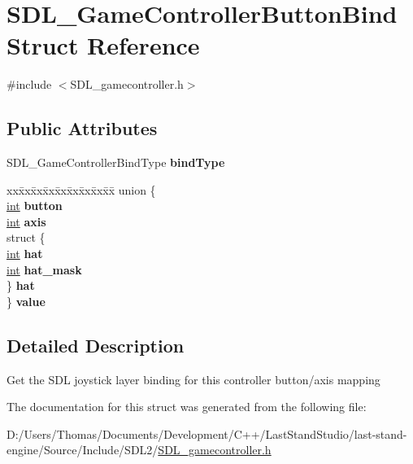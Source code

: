 \hypertarget{structSDL__GameControllerButtonBind}{}\section{S\+D\+L\+\_\+\+Game\+Controller\+Button\+Bind Struct Reference}
\label{structSDL__GameControllerButtonBind}


{\ttfamily \#include $<$S\+D\+L\+\_\+gamecontroller.\+h$>$}

\subsection*{Public Attributes}
\begin{DoxyCompactItemize}
\item 
\hypertarget{structSDL__GameControllerButtonBind_a032fd941b0e8e5e2cdf52b7597f559b9}{}S\+D\+L\+\_\+\+Game\+Controller\+Bind\+Type {\bfseries bind\+Type}\label{structSDL__GameControllerButtonBind_a032fd941b0e8e5e2cdf52b7597f559b9}

\item 
\hypertarget{structSDL__GameControllerButtonBind_a617787596bd34e89e7619a585cab0c94}{}\begin{tabbing}
xx\=xx\=xx\=xx\=xx\=xx\=xx\=xx\=xx\=\kill
union \{\\
\>\hyperlink{SDL__thread_8h_a6a64f9be4433e4de6e2f2f548cf3c08e}{int} {\bfseries button}\\
\>\hyperlink{SDL__thread_8h_a6a64f9be4433e4de6e2f2f548cf3c08e}{int} {\bfseries axis}\\
\>struct \{\\
\>\>\hyperlink{SDL__thread_8h_a6a64f9be4433e4de6e2f2f548cf3c08e}{int} {\bfseries hat}\\
\>\>\hyperlink{SDL__thread_8h_a6a64f9be4433e4de6e2f2f548cf3c08e}{int} {\bfseries hat\_mask}\\
\>\} {\bfseries hat}\\
\} {\bfseries value}\label{structSDL__GameControllerButtonBind_a617787596bd34e89e7619a585cab0c94}
\\

\end{tabbing}\end{DoxyCompactItemize}


\subsection{Detailed Description}
Get the S\+D\+L joystick layer binding for this controller button/axis mapping 

The documentation for this struct was generated from the following file\+:\begin{DoxyCompactItemize}
\item 
D\+:/\+Users/\+Thomas/\+Documents/\+Development/\+C++/\+Last\+Stand\+Studio/last-\/stand-\/engine/\+Source/\+Include/\+S\+D\+L2/\hyperlink{SDL__gamecontroller_8h}{S\+D\+L\+\_\+gamecontroller.\+h}\end{DoxyCompactItemize}
